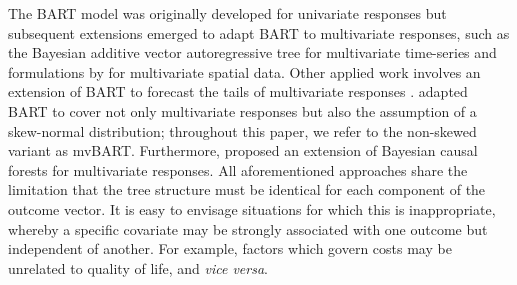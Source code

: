\documentclass[aoas,preprint]{imsart}
\theoremstyle{plain}
\theoremstyle{definition}
\theoremstyle{remark}
\begin{document}
The BART model was originally developed for univariate responses but subsequent extensions emerged to adapt BART to multivariate responses, such as the Bayesian additive vector autoregressive tree \citep{florian2022vabart} for multivariate time-series and formulations by \citet{peruzzi2022spatial} for multivariate spatial data. Other applied work involves an extension of BART to forecast the tails of multivariate responses \citep{clark2023tail}. \citet{um2023bayesian} adapted BART to cover not only multivariate responses but also the assumption of a skew-normal distribution; throughout this paper, we refer to the non-skewed variant as mvBART. Furthermore, \citet{mcjames2024bayesian} proposed an extension of Bayesian causal forests \citep[BCF;][]{hahn2020bayesian} for multivariate responses. All  aforementioned approaches share the limitation that the tree structure must be identical for each component of the outcome vector. It is easy to envisage situations for which this is inappropriate, whereby a specific covariate may be strongly associated with one outcome but independent of another. For example, factors which govern costs may be unrelated to quality of life, and \textit{vice versa}.
\end{document}
